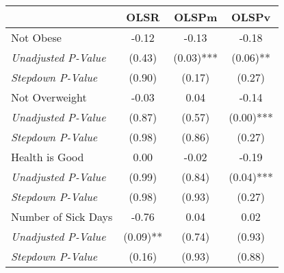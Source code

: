 \begin{tabular}{l c c c}
\toprule
 & OLSR & OLSPm & OLSPv \\
\midrule
Not Obese & -0.12 & -0.13 & -0.18 \\
\quad \textit{Unadjusted P-Value} & (0.43) & (0.03)*** & (0.06)** \\
\quad \textit{Stepdown P-Value} & (0.90) & (0.17) & (0.27) \\
Not Overweight & -0.03 & 0.04 & -0.14 \\
\quad \textit{Unadjusted P-Value} & (0.87) & (0.57) & (0.00)*** \\
\quad \textit{Stepdown P-Value} & (0.98) & (0.86) & (0.27) \\
Health is Good & 0.00 & -0.02 & -0.19 \\
\quad \textit{Unadjusted P-Value} & (0.99) & (0.84) & (0.04)*** \\
\quad \textit{Stepdown P-Value} & (0.98) & (0.93) & (0.27) \\
Number of Sick Days & -0.76 & 0.04 & 0.02 \\
\quad \textit{Unadjusted P-Value} & (0.09)** & (0.74) & (0.93) \\
\quad \textit{Stepdown P-Value} & (0.16) & (0.93) & (0.88) \\
\bottomrule
\end{tabular}
